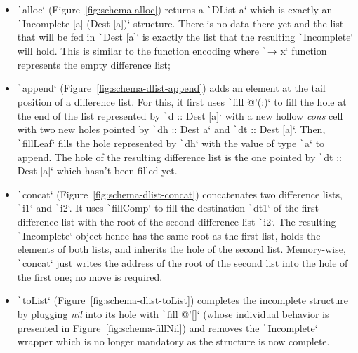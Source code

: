 \documentclass[english]{jflart}
\begin{document}


\begin{itemize}
  \item \texttt`alloc` (Figure~\ref{fig:schema-alloc}) returns a
    \texttt`DList a` which is exactly an
    \texttt`Incomplete [a] (Dest [a])` structure. There is no data
    there yet and the list that will be fed in \texttt`Dest [a]` is exactly the list that the
    resulting \texttt`Incomplete` will hold. This is
    similar to the function encoding where \texttt`\x → x` function represents the empty difference list;
    

  \item \texttt`append` (Figure~\ref{fig:schema-dlist-append}) adds an element at the tail
    position of a difference list. For this, it first uses
    \texttt`fill @'(:)` to fill the hole at the end of the list represented by
    \texttt`d :: Dest [a]` with a new hollow \emph{cons}
    cell with two new holes pointed by \texttt`dh :: Dest a` and \texttt`dt :: Dest [a]`. Then,
    \texttt`fillLeaf` fills the hole represented by
    \texttt`dh` with the value
    of type \texttt`a`
    to append. The hole of the resulting difference list is the one pointed by \texttt`dt :: Dest [a]` which hasn't been filled yet.

  \item \texttt`concat` (Figure~\ref{fig:schema-dlist-concat}) concatenates two difference lists,
    \texttt`i1` and \texttt`i2`. It uses \texttt`fillComp` to fill the destination \texttt`dt1`
    of the first difference list with the
    root of the second difference list \texttt`i2`. The resulting \texttt`Incomplete`
    object hence has the same root as the first list, holds the
    elements of both lists, and inherits the hole of the second list. Memory-wise,
    \texttt`concat` just writes the address of the root
    of the second list into the hole of the first one; no move is
    required.

  \item \texttt`toList` (Figure~\ref{fig:schema-dlist-toList}) completes the incomplete structure by plugging \emph{nil} into its hole with \texttt`fill @'[]` (whose individual behavior is presented in Figure~\ref{fig:schema-fillNil}) and removes the \texttt`Incomplete` wrapper which is no longer mandatory as the structure is now complete.
\end{itemize}
\end{document}
